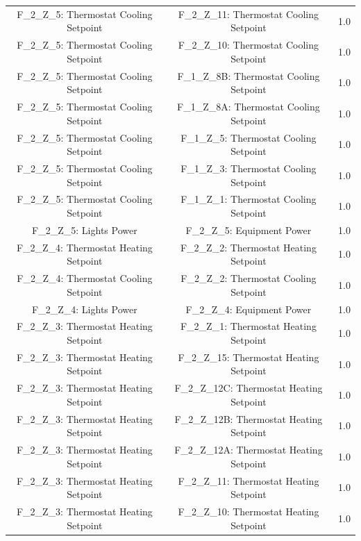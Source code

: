 \documentclass[aps, 10pt, a4paper]{article}
\begin{document}
\begin{longtable}{c|c||c}
                    F\_2\_Z\_5: Thermostat Cooling Setpoint & F\_2\_Z\_11: Thermostat Cooling Setpoint & 1.0 \\
                    F\_2\_Z\_5: Thermostat Cooling Setpoint & F\_2\_Z\_10: Thermostat Cooling Setpoint & 1.0 \\
                    F\_2\_Z\_5: Thermostat Cooling Setpoint & F\_1\_Z\_8B: Thermostat Cooling Setpoint & 1.0 \\
                    F\_2\_Z\_5: Thermostat Cooling Setpoint & F\_1\_Z\_8A: Thermostat Cooling Setpoint & 1.0 \\
                    F\_2\_Z\_5: Thermostat Cooling Setpoint & F\_1\_Z\_5: Thermostat Cooling Setpoint & 1.0 \\
                    F\_2\_Z\_5: Thermostat Cooling Setpoint & F\_1\_Z\_3: Thermostat Cooling Setpoint & 1.0 \\
                    F\_2\_Z\_5: Thermostat Cooling Setpoint & F\_1\_Z\_1: Thermostat Cooling Setpoint & 1.0 \\
                    F\_2\_Z\_5: Lights Power & F\_2\_Z\_5: Equipment Power & 1.0 \\
                    F\_2\_Z\_4: Thermostat Heating Setpoint & F\_2\_Z\_2: Thermostat Heating Setpoint & 1.0 \\
                    F\_2\_Z\_4: Thermostat Cooling Setpoint & F\_2\_Z\_2: Thermostat Cooling Setpoint & 1.0 \\
                    F\_2\_Z\_4: Lights Power & F\_2\_Z\_4: Equipment Power & 1.0 \\
                    F\_2\_Z\_3: Thermostat Heating Setpoint & F\_2\_Z\_1: Thermostat Heating Setpoint & 1.0 \\
                    F\_2\_Z\_3: Thermostat Heating Setpoint & F\_2\_Z\_15: Thermostat Heating Setpoint & 1.0 \\
                    F\_2\_Z\_3: Thermostat Heating Setpoint & F\_2\_Z\_12C: Thermostat Heating Setpoint & 1.0 \\
                    F\_2\_Z\_3: Thermostat Heating Setpoint & F\_2\_Z\_12B: Thermostat Heating Setpoint & 1.0 \\
                    F\_2\_Z\_3: Thermostat Heating Setpoint & F\_2\_Z\_12A: Thermostat Heating Setpoint & 1.0 \\
                    F\_2\_Z\_3: Thermostat Heating Setpoint & F\_2\_Z\_11: Thermostat Heating Setpoint & 1.0 \\
                    F\_2\_Z\_3: Thermostat Heating Setpoint & F\_2\_Z\_10: Thermostat Heating Setpoint & 1.0 \\

\end{longtable}
\end{document}
